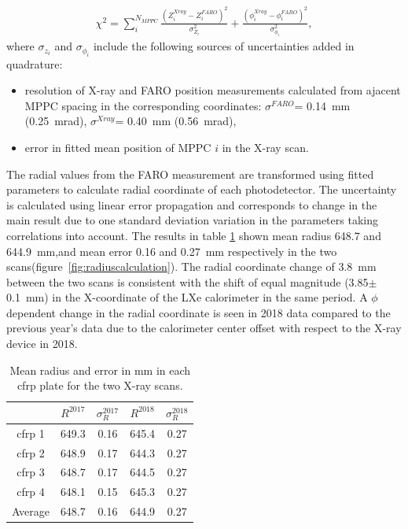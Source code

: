 \begin {align}
\chi^2 = \sum\limits_{i}^{N_{MPPC}} \frac{(Z_{i}^{Xray}-Z_{i}^{FARO})^2}{\sigma_{Z_{i}}^2} + 
         \frac{(\phi_{i}^{Xray}-\phi_{i}^{FARO})^2}{\sigma_{\phi_i}^2},
\end{align}
where $\sigma_{z_i}$ and $\sigma_{\phi_i}$ include the following sources of
uncertainties added in quadrature: 
\begin {itemize} 
\item resolution of X-ray and FARO position measurements  calculated from ajacent 
MPPC spacing in the corresponding coordinates:
$\sigma^{FARO}$= 0.14~mm (0.25~mrad), $\sigma^{Xray}$= 0.40~mm (0.56~mrad),

\item  error in fitted mean position of MPPC $i$ in the X-ray scan.
\end{itemize}

The radial values from the FARO measurement are transformed using fitted
parameters to calculate radial coordinate of each photodetector.  The
uncertainty is calculated using linear error propagation and corresponds to
change in the main result due to one standard deviation variation in the
parameters taking correlations into account.  The results in table
\ref{tab:radius} shown mean radius 648.7 and 644.9~mm,and mean error 0.16 and
0.27~mm respectively in the two scans(figure~\ref{fig:radiuscalculation}).  The
radial coordinate change of 3.8~mm between the two scans is consistent with the
shift of equal magnitude (3.85$\pm$0.1~mm) in the X-coordinate of the LXe
calorimeter in the same period.  A $\phi$ dependent change in the radial
coordinate is seen in 2018 data compared to the previous year's data due to the
calorimeter center offset with respect to the X-ray device in 2018.

\begin{table}
\begin{tabular}{ccccc}
 & $R^{2017}$ & $\sigma_R^{2017}$ & $R^{2018}$  & $\sigma_R^{2018}$  \\
\hline
cfrp 1 &  649.3 & 0.16 & 645.4 & 0.27 \\
cfrp 2 &  648.9 & 0.17 & 644.3 & 0.27 \\
cfrp 3 &  648.7 & 0.17 & 644.5 & 0.27 \\
cfrp 4 &  648.1 & 0.15 & 645.3 & 0.27 \\
Average&  648.7 & 0.16 & 644.9 & 0.27 \\
\end{tabular}
\caption{Mean radius and error in mm in each cfrp plate for the two X-ray scans.}
\label{tab:radius}
\end{table}

